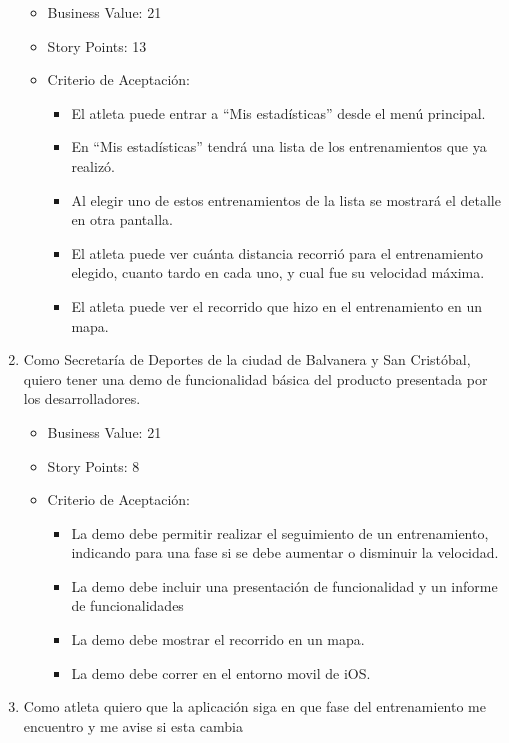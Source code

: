 \begin{enumerate}
  \begin{itemize}
  \itemsep1pt\parskip0pt
  \item
    Business Value: 21
  \item
    Story Points: 13
  \item
    Criterio de Aceptación:

    \begin{itemize}
    \itemsep1pt\parskip0pt
    \item
      El atleta puede entrar a ``Mis estadísticas'' desde el menú
      principal.
    \item
      En ``Mis estadísticas'' tendrá una lista de los entrenamientos que
      ya realizó.
    \item
      Al elegir uno de estos entrenamientos de la lista se mostrará el
      detalle en otra pantalla.
    \item
      El atleta puede ver cuánta distancia recorrió para el
      entrenamiento elegido, cuanto tardo en cada uno, y cual fue su
      velocidad máxima.
    \item
      El atleta puede ver el recorrido que hizo en el entrenamiento en
      un mapa.
    \end{itemize}
  \end{itemize}
\item
  Como Secretaría de Deportes de la ciudad de Balvanera y San Cristóbal,
  quiero tener una demo de funcionalidad básica del producto presentada
  por los desarrolladores.

  \begin{itemize}
  \itemsep1pt\parskip0pt
  \item
    Business Value: 21
  \item
    Story Points: 8
  \item
    Criterio de Aceptación:

    \begin{itemize}
    \itemsep1pt\parskip0pt
    \item
      La demo debe permitir realizar el seguimiento de un entrenamiento,
      indicando para una fase si se debe aumentar o disminuir la
      velocidad.
    \item
      La demo debe incluir una presentación de funcionalidad y un
      informe de funcionalidades
    \item
      La demo debe mostrar el recorrido en un mapa.
    \item
      La demo debe correr en el entorno movil de iOS.
    \end{itemize}
  \end{itemize}
\item
  Como atleta quiero que la aplicación siga en que fase del
  entrenamiento me encuentro y me avise si esta cambia


\end{enumerate}
